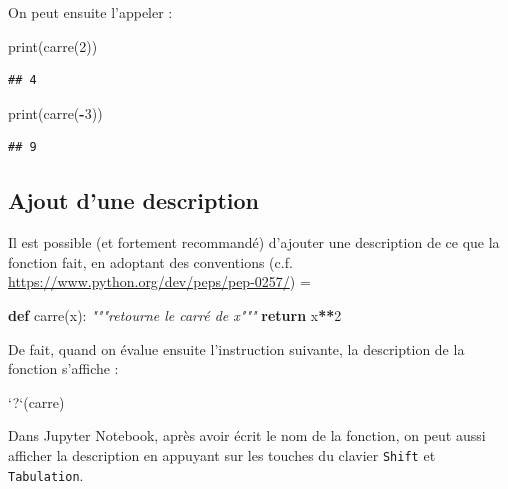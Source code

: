 \documentclass[12pt,]{book}
\newenvironment{Shaded}{\begin{snugshade}}{\end{snugshade}}
\newcommand{\KeywordTok}[1]{\textcolor[rgb]{0.13,0.29,0.53}{\textbf{#1}}}
\newcommand{\DataTypeTok}[1]{\textcolor[rgb]{0.13,0.29,0.53}{#1}}
\newcommand{\DecValTok}[1]{\textcolor[rgb]{0.00,0.00,0.81}{#1}}
\newcommand{\StringTok}[1]{\textcolor[rgb]{0.31,0.60,0.02}{#1}}
\newcommand{\CommentTok}[1]{\textcolor[rgb]{0.56,0.35,0.01}{\textit{#1}}}
\newcommand{\ControlFlowTok}[1]{\textcolor[rgb]{0.13,0.29,0.53}{\textbf{#1}}}
\newcommand{\OperatorTok}[1]{\textcolor[rgb]{0.81,0.36,0.00}{\textbf{#1}}}
\newcommand{\BuiltInTok}[1]{#1}
\newcommand{\NormalTok}[1]{#1}
\numberwithin{equation}{section}
\numberwithin{countremarque}{section}
\begin{document}
On peut ensuite l'appeler :

\begin{Shaded}
\begin{Highlighting}[]
\BuiltInTok{print}\NormalTok{(carre(}\DecValTok{2}\NormalTok{))}
\end{Highlighting}
\end{Shaded}

\begin{lstlisting}
## 4
\end{lstlisting}

\begin{Shaded}
\begin{Highlighting}[]
\BuiltInTok{print}\NormalTok{(carre(}\OperatorTok{-}\DecValTok{3}\NormalTok{))}
\end{Highlighting}
\end{Shaded}

\begin{lstlisting}
## 9
\end{lstlisting}

\subsection{Ajout d'une description}\label{ajout-dune-description}

Il est possible (et fortement recommandé) d'ajouter une description de
ce que la fonction fait, en adoptant des conventions (c.f.
\url{https://www.python.org/dev/peps/pep-0257/}) =

\begin{Shaded}
\begin{Highlighting}[]
\KeywordTok{def}\NormalTok{ carre(x):}
  \CommentTok{"""retourne le carré de x"""}
  \ControlFlowTok{return}\NormalTok{ x}\OperatorTok{**}\DecValTok{2}
\end{Highlighting}
\end{Shaded}

De fait, quand on évalue ensuite l'instruction suivante, la description
de la fonction s'affiche :

\begin{Shaded}
\begin{Highlighting}[]
\StringTok{`}\DataTypeTok{?}\StringTok{`}\NormalTok{(carre)}
\end{Highlighting}
\end{Shaded}

Dans Jupyter Notebook, après avoir écrit le nom de la fonction, on peut
aussi afficher la description en appuyant sur les touches du clavier
\texttt{Shift} et \texttt{Tabulation}.
\end{document}
